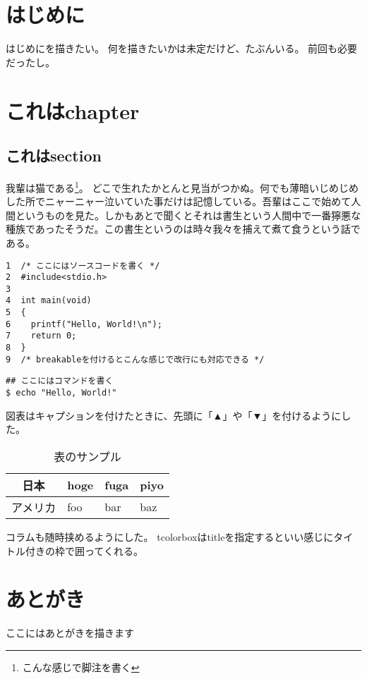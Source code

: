 \documentclass[11pt,dvipdfmx,b5paper,oneside]{jsbook}
\begin{document}
\chapter*{はじめに}
はじめにを描きたい。
何を描きたいかは未定だけど、たぶんいる。
前回も必要だったし。

\tableofcontents
\clearpage

\chapter{これはchapter}
\section{これはsection}
我輩は猫である\footnote{こんな感じで脚注を書く}。
どこで生れたかとんと見当がつかぬ。何でも薄暗いじめじめした所でニャーニャー泣いていた事だけは記憶している。吾輩はここで始めて人間というものを見た。しかもあとで聞くとそれは書生という人間中で一番獰悪な種族であったそうだ。この書生というのは時々我々を捕えて煮て食うという話である。
\begin{tcolorbox}[breakable]
\begin{verbatim}
1  /* ここにはソースコードを書く */
2  #include<stdio.h>
3
4  int main(void)
5  {
6    printf("Hello, World!\n");
7    return 0;
8  }
9  /* breakableを付けるとこんな感じで改行にも対応できる */
\end{verbatim}
\end{tcolorbox}
\begin{shaded}
\begin{verbatim}
## ここにはコマンドを書く
$ echo "Hello, World!"
\end{verbatim}
\end{shaded}
図表はキャプションを付けたときに、先頭に「▲」や「▼」を付けるようにした。
\begin{table}[H]
  \centering
  \caption{表のサンプル}
  \begin{tabular}{|c|l|l|l|} \hline
    日本 & hoge & fuga & piyo \\ \hline
    アメリカ & foo & bar & baz \\ \hline
  \end{tabular}
  \label{table-sample}
\end{table}
\begin{tcolorbox}[title=これはコラム]
  コラムも随時挟めるようにした。
  tcolorboxはtitleを指定するといい感じにタイトル付きの枠で囲ってくれる。
\end{tcolorbox}

\chapter*{あとがき}
ここにはあとがきを描きます
\end{document}
